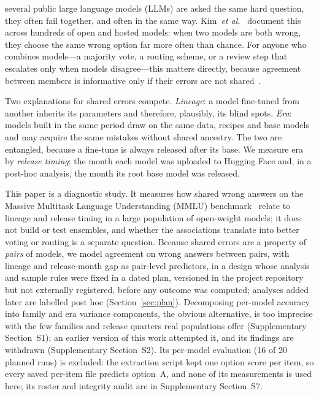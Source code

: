 \documentclass{ieeeaccess}
\theoremstyle{definition}
\theoremstyle{plain}
\begin{document}
 several public large language models (LLMs) are asked the same hard question, they often fail together, and often in the same way. Kim~\textit{et al.}~\cite{kim2025} document this across hundreds of open and hosted models: when two models are both wrong, they choose the same wrong option far more often than chance. For anyone who combines models---a majority vote, a routing scheme, or a review step that escalates only when models disagree---this matters directly, because agreement between members is informative only if their errors are not shared~\cite{dietterich2000,kuncheva2003}.

Two explanations for shared errors compete. \emph{Lineage}: a model fine-tuned from another inherits its parameters and therefore, plausibly, its blind spots. \emph{Era}: models built in the same period draw on the same data, recipes and base models and may acquire the same mistakes without shared ancestry. The two are entangled, because a fine-tune is always released after its base. We measure era by \emph{release timing}: the month each model was uploaded to Hugging Face and, in a post-hoc analysis, the month its root base model was released.

This paper is a diagnostic study. It measures how shared wrong answers on the Massive Multitask Language Understanding (MMLU) benchmark~\cite{hendrycks2021} relate to lineage and release timing in a large population of open-weight models; it does not build or test ensembles, and whether the associations translate into better voting or routing is a separate question. Because shared errors are a property of \emph{pairs} of models, we model agreement on wrong answers between pairs, with lineage and release-month gap as pair-level predictors, in a design whose analysis and sample rules were fixed in a dated plan, versioned in the project repository but not externally registered, before any outcome was computed; analyses added later are labelled post hoc (Section~\ref{sec:plan}). Decomposing per-model accuracy into family and era variance components, the obvious alternative, is too imprecise with the few families and release quarters real populations offer (Supplementary Section~S1); an earlier version of this work attempted it, and its findings are withdrawn (Supplementary Section~S2). Its per-model evaluation (16 of 20 planned runs) is excluded: the extraction script kept one option score per item, so every saved per-item file predicts option~A, and none of its measurements is used here; its roster and integrity audit are in Supplementary Section~S7.
\end{document}
